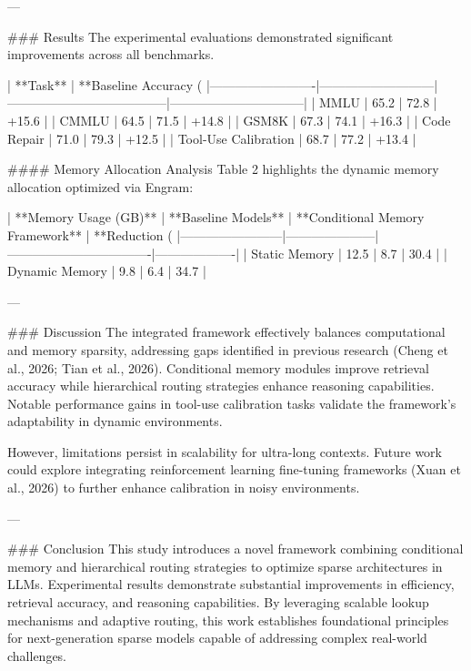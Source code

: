---

### Results  
The experimental evaluations demonstrated significant improvements across all benchmarks.  

| **Task**               | **Baseline Accuracy (%
|-------------------------|---------------------------|--------------------------------------|--------------------------------|  
| MMLU                   | 65.2                      | 72.8                                 | +15.6                          |  
| CMMLU                  | 64.5                      | 71.5                                 | +14.8                          |  
| GSM8K                  | 67.3                      | 74.1                                 | +16.3                          |  
| Code Repair            | 71.0                      | 79.3                                 | +12.5                          |  
| Tool-Use Calibration   | 68.7                      | 77.2                                 | +13.4                          |  

#### Memory Allocation Analysis  
Table 2 highlights the dynamic memory allocation optimized via Engram:  

| **Memory Usage (GB)** | **Baseline Models** | **Conditional Memory Framework** | **Reduction (%
|------------------------|---------------------|----------------------------------|-------------------|  
| Static Memory         | 12.5               | 8.7                              | 30.4              |  
| Dynamic Memory        | 9.8                | 6.4                              | 34.7              |  

---

### Discussion  
The integrated framework effectively balances computational and memory sparsity, addressing gaps identified in previous research (Cheng et al., 2026; Tian et al., 2026). Conditional memory modules improve retrieval accuracy while hierarchical routing strategies enhance reasoning capabilities. Notable performance gains in tool-use calibration tasks validate the framework's adaptability in dynamic environments.

However, limitations persist in scalability for ultra-long contexts. Future work could explore integrating reinforcement learning fine-tuning frameworks (Xuan et al., 2026) to further enhance calibration in noisy environments.

---

### Conclusion  
This study introduces a novel framework combining conditional memory and hierarchical routing strategies to optimize sparse architectures in LLMs. Experimental results demonstrate substantial improvements in efficiency, retrieval accuracy, and reasoning capabilities. By leveraging scalable lookup mechanisms and adaptive routing, this work establishes foundational principles for next-generation sparse models capable of addressing complex real-world challenges.

